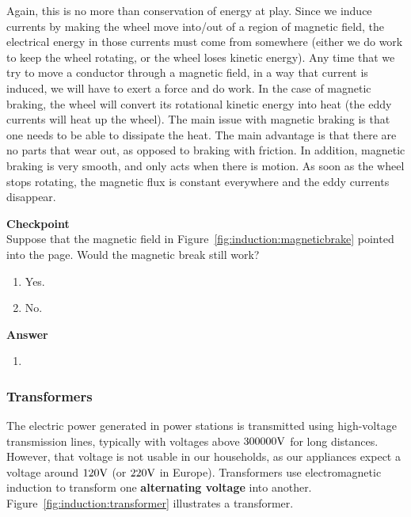 Again, this is no more than conservation of energy at play. Since we induce currents by making the wheel move into/out of a region of magnetic field, the electrical energy in those currents must come from somewhere (either we do work to keep the wheel rotating, or the wheel loses kinetic energy). Any time that we try to move a conductor through a magnetic field, in a way that current is induced, we will have to exert a force and do work. In the case of magnetic braking, the wheel will convert its rotational kinetic energy into heat (the eddy currents will heat up the wheel). The main issue with magnetic braking is that one needs to be able to dissipate the heat. The main advantage is that there are no parts that wear out, as opposed to braking with friction. In addition, magnetic braking is very smooth, and only acts when there is motion. As soon as the wheel stops rotating, the magnetic flux is constant everywhere and the eddy currents disappear.

\begin{framed}
\textbf{Checkpoint}\\
Suppose that the magnetic field in Figure~\ref{fig:induction:magneticbrake} pointed into the page. Would the magnetic break still work?

\begin{enumerate}
\item Yes.
\item No.
\end{enumerate}

\begin{framed}
\textbf{Answer}\\
\begin{enumerate}
\item
\end{enumerate}
\end{framed}
\end{framed}

\subsubsection{Transformers}

The electric power generated in power stations is transmitted using high-voltage transmission lines, typically with voltages above $300000 {\rm V}$ for long distances. However, that voltage is not usable in our households, as our appliances expect a voltage around $120 {\rm V}$ (or $220 {\rm V}$ in Europe). Transformers use electromagnetic induction to transform one \textbf{alternating voltage} into another. Figure~\ref{fig:induction:transformer} illustrates a transformer.

